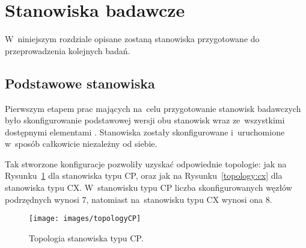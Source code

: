 \section{Stanowiska badawcze}
\label{sec:stanowiska}
W~niniejszym rozdziale opisane zostaną stanowiska przygotowane do przeprowadzenia kolejnych badań.

\subsection{Podstawowe stanowiska}
Pierwszym etapem prac mających na~celu przygotowanie stanowisk badawczych było skonfigurowanie podstawowej wersji obu stanowisk wraz ze~wszystkimi dostępnymi elementami \cite{kurs2}. Stanowiska zostały skonfigurowane i~uruchomione w~sposób całkowicie niezależny od siebie.

Tak stworzone konfiguracje pozwoliły uzyskać odpowiednie topologie: jak na Rysunku~\ref{topology:cp} dla stanowiska typu CP, oraz jak na Rysunku~\ref{topology:cx} dla stanowiska typu CX. W~stanowisku typu CP liczba skonfigurowanych węzłów podrzędnych wynosi 7, natomiast na~stanowisku typu CX wynosi ona 8.
\begin{figure}[!htb] 	\centering 	\texttt{[image: images/topologyCP]} \caption{Topologia stanowiska typu CP.} \label{topology:cp} \end{figure}

